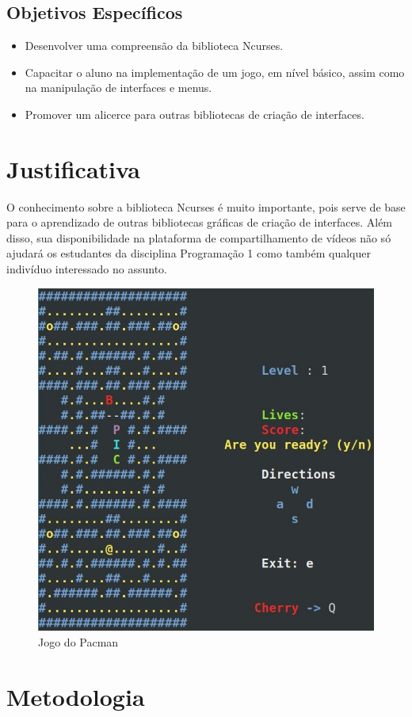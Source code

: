 \documentclass[a4paper,10pt]{article} %
\begin{document}
\subsection{Objetivos Específicos}

\begin{itemize}
 \item Desenvolver uma compreensão da biblioteca Ncurses.
 \item Capacitar o aluno na implementação de um jogo, em nível básico, assim como na manipulação de interfaces e menus.
 \item Promover um alicerce para outras bibliotecas de criação de interfaces.
\end{itemize}


\section{Justificativa}

O conhecimento sobre a biblioteca Ncurses é muito importante, pois serve de base para o aprendizado de outras bibliotecas gráficas de criação de interfaces. Além disso, sua disponibilidade na plataforma de compartilhamento de vídeos não só ajudará os estudantes da disciplina Programação 1 como também qualquer indivíduo interessado no assunto.

\begin{figure}[!htbp] %
\centering
\includegraphics[width=.40\linewidth]{imagens/imagem.jpg}
\caption{Jogo do Pacman}
\label{fig:xsort}
\end{figure}


\section{Metodologia}
\end{document}
